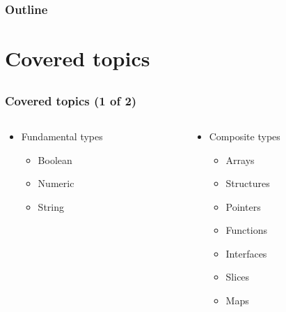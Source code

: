 \begin{frame}[plain,c]
  \titlepage  
\end{frame}

\begin{frame}[t]
  \frametitle{Outline}

  \tableofcontents  
\end{frame}

\section{Covered topics}
\subsection*{}

\begin{frame}[t]
  \frametitle{Covered topics (1 of 2)}

  \begin{columns}[T]
    \begin{column}{0.5\linewidth}
      \begin{itemize}
      \item Fundamental types
        \begin{itemize}
        \item Boolean
        \item Numeric
        \item String
        \end{itemize}
      \end{itemize}      
    \end{column}
    \begin{column}{0.5\linewidth}
      \begin{itemize}
      \item Composite types
        \begin{itemize}
        \item Arrays
        \item Structures
        \item Pointers
        \item Functions
        \item Interfaces
        \item Slices
        \item Maps
        \end{itemize}
      \end{itemize}
    \end{column}
  \end{columns}
\end{frame}

